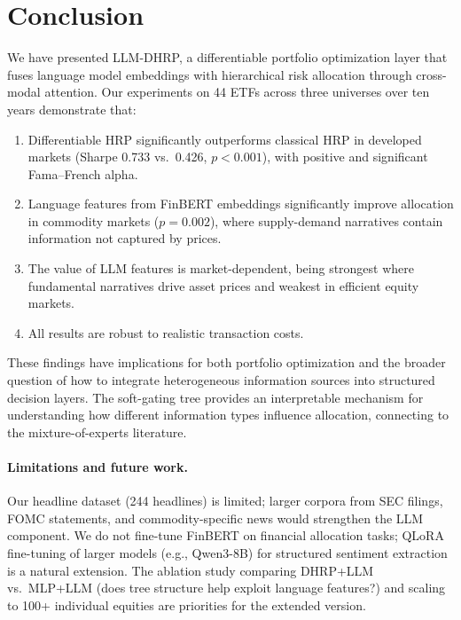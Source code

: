 \documentclass[11pt]{article}
\begin{document}
\section{Conclusion}

We have presented LLM-DHRP, a differentiable portfolio optimization layer that fuses language model embeddings with hierarchical risk allocation through cross-modal attention. Our experiments on 44 ETFs across three universes over ten years demonstrate that:

\begin{enumerate}
    \item Differentiable HRP significantly outperforms classical HRP in developed markets (Sharpe 0.733 vs.\ 0.426, $p < 0.001$), with positive and significant Fama--French alpha.
    \item Language features from FinBERT embeddings significantly improve allocation in commodity markets ($p = 0.002$), where supply-demand narratives contain information not captured by prices.
    \item The value of LLM features is market-dependent, being strongest where fundamental narratives drive asset prices and weakest in efficient equity markets.
    \item All results are robust to realistic transaction costs.
\end{enumerate}

These findings have implications for both portfolio optimization and the broader question of how to integrate heterogeneous information sources into structured decision layers. The soft-gating tree provides an interpretable mechanism for understanding how different information types influence allocation, connecting to the mixture-of-experts literature.

\paragraph{Limitations and future work.} Our headline dataset (244 headlines) is limited; larger corpora from SEC filings, FOMC statements, and commodity-specific news would strengthen the LLM component. We do not fine-tune FinBERT on financial allocation tasks; QLoRA fine-tuning of larger models (e.g., Qwen3-8B) for structured sentiment extraction is a natural extension. The ablation study comparing DHRP+LLM vs.\ MLP+LLM (does tree structure help exploit language features?) and scaling to 100+ individual equities are priorities for the extended version.
\end{document}
